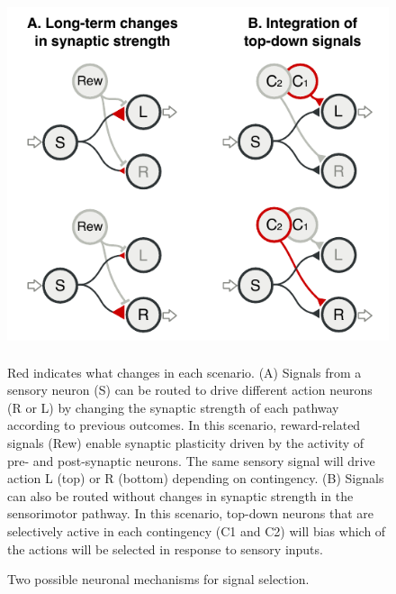 \begin{figure}[hp]
  \begin{center}
    \includegraphics[height=4in]{figures/chapter5/figure_mechanisms}%
  \end{center}
\caption{Two possible neuronal mechanisms for signal selection.}{Red indicates what changes in each scenario. (A) Signals from a sensory neuron (S) can be routed to drive different action neurons (R or L) by changing the synaptic strength of each pathway according to previous outcomes. In this scenario, reward-related signals (Rew) enable synaptic plasticity driven by the activity of pre- and post-synaptic neurons. The same sensory signal will drive action L (top) or R (bottom) depending on contingency. (B) Signals can also be routed without changes in synaptic strength in the sensorimotor pathway. In this scenario, top-down neurons that are selectively active in each contingency (C1 and C2) will bias which of the actions will be selected in response to sensory inputs. 
}
\end{figure}


